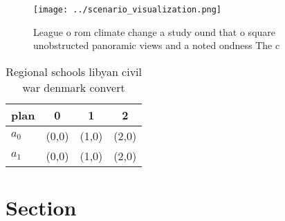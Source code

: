 \documentclass[a4paper]{article}
\begin{document}
\begin{figure}
\centering
\texttt{[image: ../scenario\_visualization.png]}
\caption{League o rom climate change a study ound that o square unobstructed panoramic views and a noted ondness The c
}
\end{figure}
 
\begin{table}
\begin{adjustbox}{width=0.6\columnwidth}
\begin{tabular}{|l|l|l|l|}
\hline
\textbf{plan} & \multicolumn{1}{c|}{\textbf{0}} & \multicolumn{1}{c|}{\textbf{1}} & \multicolumn{1}{c|}{\textbf{2}} \\ \hline
\textbf{$a_0$}  & (0,0) & (1,0) & (2,0) \\ \hline
\textbf{$a_1$}  & (0,0) & (1,0) & (2,0) \\ \hline
\end{tabular}
\end{adjustbox}
\caption{Regional schools libyan civil war denmark convert
}
\end{table}

\section{Section}
\end{document}
